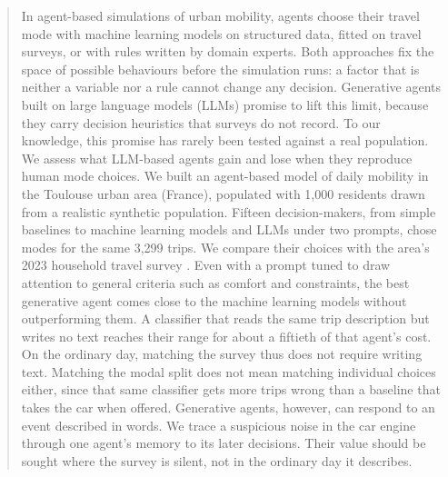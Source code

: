 \begin{abstract}
In agent-based simulations of urban mobility, agents choose their travel mode with machine
learning models on structured data, fitted on travel surveys, or with rules written by domain
experts. Both approaches fix the space of possible behaviours before the simulation runs: a
factor that is neither a variable nor a rule cannot change any decision. Generative agents
built on large language models (LLMs) promise to lift this limit, because they carry decision
heuristics that surveys do not record. To our knowledge, this promise has rarely been tested
against a real population. We assess what LLM-based agents gain and lose when they reproduce
human mode choices. We built an agent-based model of daily mobility in the Toulouse urban area
(France), populated with 1{,}000 residents drawn from a realistic synthetic population.
Fifteen decision-makers, from simple baselines to machine learning models and LLMs under two
prompts, chose modes for the same 3{,}299 trips. We compare their choices with the area's
2023 household travel survey \citep{tisseo2023emc2}.
Even with a prompt tuned to draw attention to general criteria such as comfort and
constraints, the best generative agent comes close to the machine learning models without
outperforming them. A classifier that reads the same trip description but writes no text
reaches their range for about a fiftieth of that agent's cost. On the ordinary day, matching
the survey thus does not require writing text. Matching the modal split
does not mean matching individual choices either, since that same classifier gets more trips
wrong than a baseline that takes the car when offered. Generative agents, however, can
respond to an event described in words. We trace a suspicious noise in the car engine through one agent's memory
to its later decisions. Their value should be sought where the survey is silent, not in the
ordinary day it describes.
\end{abstract}
